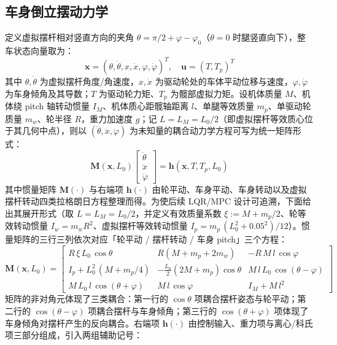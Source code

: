\documentclass{smbuthesis}
\begin{document}
\subsection{车身倒立摆动力学}

定义虚拟摆杆相对竖直方向的夹角 $\theta = \pi/2 + \varphi - \varphi_0$（$\theta = 0$ 时腿竖直向下），整车状态向量取为：
\begin{equation}
\label{eq:state-input}
\mathbf{x} = (\theta, \dot\theta, x, \dot x, \varphi, \dot\varphi)^T,\quad
\mathbf{u} = (T, T_p)^T
\end{equation}
其中 $\theta, \dot\theta$ 为虚拟摆杆角度/角速度，$x, \dot x$ 为驱动轮处的车体平动位移与速度，$\varphi, \dot\varphi$ 为车身倾角及其导数；$T$ 为驱动轮力矩、$T_p$ 为髋部虚拟力矩。设机体质量 $M$、机体绕 pitch 轴转动惯量 $I_M$、机体质心距髋轴距离 $l$、单腿等效质量 $m_p$、单驱动轮质量 $m_w$、轮半径 $R$，重力加速度 $g$；记 $L = L_M = L_0/2$（即虚拟摆杆等效质心位于其几何中点），则以 $(\ddot{\theta}, \ddot{x}, \ddot{\varphi})$ 为未知量的耦合动力学方程可写为统一矩阵形式：
\begin{equation}
\label{eq:dyn-mass}
\mathbf{M}(\mathbf{x}, L_0)\begin{bmatrix} \ddot\theta \\ \ddot x \\ \ddot\varphi \end{bmatrix}
= \mathbf{h}(\mathbf{x}, T, T_p, L_0)
\end{equation}
其中惯量矩阵 $\mathbf{M}(\cdot)$ 与右端项 $\mathbf{h}(\cdot)$ 由轮平动、车身平动、车身转动以及虚拟摆杆转动四类拉格朗日方程整理而得。为使后续 LQR/MPC 设计可追溯，下面给出其展开形式（取 $L = L_M = L_0/2$，并定义有效质量系数 $\xi := M + m_p/2$、轮等效转动惯量 $I_w = m_w R^2$、虚拟摆杆等效转动惯量 $I_p = m_p\,(L_0^2 + 0.05^2)/12$）。惯量矩阵的三行三列依次对应「轮平动 / 摆杆转动 / 车身 pitch」三个方程：
\begin{equation}
\label{eq:M-mat}
\mathbf{M}(\mathbf{x}, L_0) =
\begin{bmatrix}
R\,\xi\,L_0\,\cos\theta            & R(M + m_p + 2 m_w)        & -R\,M\,l\,\cos\varphi \\[2pt]
I_p + L_0^2\,(M + m_p/4)            & -\tfrac{L_0}{2}(2M+m_p)\cos\theta & M\,l\,L_0\,\cos(\theta-\varphi) \\[2pt]
M\,L_0\,l\,\cos(\theta+\varphi)     & M\,l\,\cos\varphi          & I_M + M\,l^2
\end{bmatrix}
\end{equation}
矩阵的非对角元体现了三类耦合：第一行的 $\cos\theta$ 项耦合摆杆姿态与轮平动；第二行的 $\cos(\theta-\varphi)$ 项耦合摆杆与车身倾角；第三行的 $\cos(\theta+\varphi)$ 项体现了车身倾角对摆杆产生的反向耦合。右端项 $\mathbf{h}(\cdot)$ 由控制输入、重力项与离心/科氏项三部分组成，引入两组辅助记号：
\end{document}
